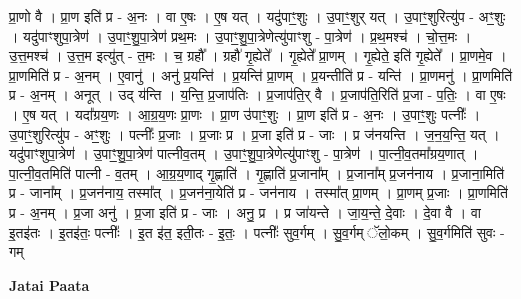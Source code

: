 \documentclass[17pt]{extarticle}
\begin{document}
प्रा॒णो वै । प्रा॒ण इति॑ प्र - अ॒नः । वा ए॒षः । ए॒ष यत् । यदु॑पाꣳ॒॒शुः । उ॒पाꣳ॒॒शुर् यत् । उ॒पाꣳ॒॒शुरित्यु॑प - अꣳ॒॒शुः । यदु॑पाꣳशुपा॒त्रेण॑ । उ॒पाꣳ॒॒शु॒पा॒त्रेण॑ प्रथ॒मः । उ॒पाꣳ॒॒शु॒पा॒त्रेणेत्यु॑पाꣳशु - पा॒त्रेण॑ । प्र॒थ॒मश्च॑ । चो॒त्त॒मः । उ॒त्त॒मश्च॑ । उ॒त्त॒म इत्यु॑त् - त॒मः । च॒ ग्रहौ᳚ । ग्रहौ॑ गृ॒ह्येते᳚ । गृ॒ह्येते᳚ प्रा॒णम् । गृ॒ह्येते॒ इति॑ गृ॒ह्येते᳚ । प्रा॒णमे॒व । प्रा॒णमिति॑ प्र - अ॒नम् । ए॒वानु॑ । अनु॑ प्र॒यन्ति॑ । प्र॒यन्ति॑ प्रा॒णम् । प्र॒यन्तीति॑ प्र - यन्ति॑ । प्रा॒णमनु॑ । प्रा॒णमिति॑ प्र - अ॒नम् । अनूत् । उद् य॑न्ति । य॒न्ति॒ प्र॒जाप॑तिः । प्र॒जाप॑ति॒र् वै । प्र॒जाप॑ति॒रिति॑ प्र॒जा - प॒तिः॒ । वा ए॒षः । ए॒ष यत् । यदा᳚ग्रय॒णः । आ॒ग्र॒य॒णः प्रा॒णः । प्रा॒ण उ॑पाꣳ॒॒शुः । प्रा॒ण इति॑ प्र - अ॒नः । उ॒पाꣳ॒॒शुः पत्नीः᳚ । उ॒पाꣳ॒॒शुरित्यु॑प - अꣳ॒॒शुः । पत्नीः᳚ प्र॒जाः । प्र॒जाः प्र । प्र॒जा इति॑ प्र - जाः । प्र ज॑नयन्ति । ज॒न॒य॒न्ति॒ यत् । यदु॑पाꣳशुपा॒त्रेण॑ । उ॒पाꣳ॒॒शु॒पा॒त्रेण॑ पात्नीव॒तम् । उ॒पाꣳ॒॒शु॒पा॒त्रेणेत्यु॑पाꣳशु - पा॒त्रेण॑ । पा॒त्नी॒व॒तमा᳚ग्रय॒णात् । पा॒त्नी॒व॒तमिति॑ पात्नी - व॒तम् । आ॒ग्र॒य॒णाद् गृ॒ह्णाति॑ । गृ॒ह्णाति॑ प्र॒जाना᳚म् । प्र॒जाना᳚म् प्र॒जन॑नाय । प्र॒जाना॒मिति॑ प्र - जाना᳚म् । प्र॒जन॑नाय॒ तस्मा᳚त् । प्र॒जन॑ना॒येति॑ प्र - जन॑नाय । तस्मा᳚त् प्रा॒णम् । प्रा॒णम् प्र॒जाः । प्रा॒णमिति॑ प्र - अ॒नम् । प्र॒जा अनु॑ । प्र॒जा इति॑ प्र - जाः । अनु॒ प्र । प्र जा॑यन्ते । जा॒य॒न्ते॒ दे॒वाः । दे॒वा वै । वा इ॒त‍इ॑तः । इ॒त‍इ॑तः॒ पत्नीः᳚ । इ॒त इ॑त॒ इती॒तः - इ॒तः॒ । पत्नीः᳚ सुव॒र्गम् । सु॒व॒र्गम् ॅलो॒कम् । सु॒व॒र्गमिति॑ सुवः - गम् \newline

\textbf{Jatai Paata} \newline
\end{document}
